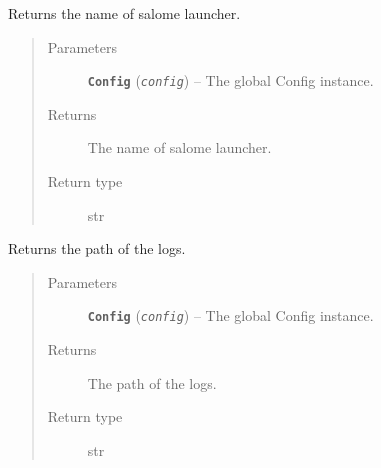 \documentclass[a4paper,10pt,english]{sphinxmanual}
\begin{document}

\begin{fulllineitems}
\label{commands/apidoc/src:src.utilsSat.get_launcher_name}
Returns the name of salome launcher.
\begin{quote}\begin{description}
\item[{Parameters}] \leavevmode
\textbf{\texttt{Config}} (\emph{\texttt{config}}) -- The global Config instance.

\item[{Returns}] \leavevmode
The name of salome launcher.

\item[{Return type}] \leavevmode
str

\end{description}\end{quote}

\end{fulllineitems}


\begin{fulllineitems}
\label{commands/apidoc/src:src.utilsSat.get_log_path}
Returns the path of the logs.
\begin{quote}\begin{description}
\item[{Parameters}] \leavevmode
\textbf{\texttt{Config}} (\emph{\texttt{config}}) -- The global Config instance.

\item[{Returns}] \leavevmode
The path of the logs.

\item[{Return type}] \leavevmode
str

\end{description}\end{quote}

\end{fulllineitems}


\begin{fulllineitems}
\label{commands/apidoc/src:src.utilsSat.get_property_in_product_cfg}
\end{fulllineitems}
\end{document}
